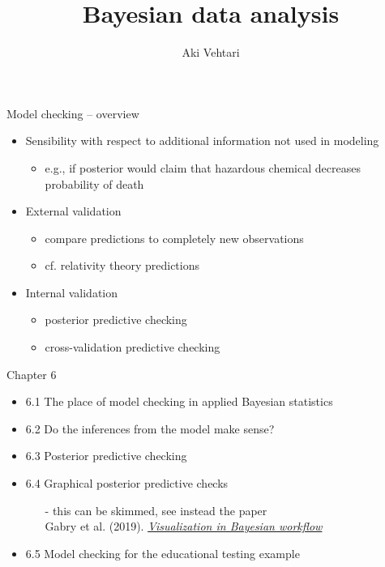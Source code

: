 \documentclass[t]{beamer}
\title[]{Bayesian data analysis}
\subtitle{}
\author{Aki Vehtari}
\institute[Aalto]{}
\begin{document}
 \begin{frame}{Model checking -- overview}

  \begin{itemize}
  \item<+-> Sensibility with respect to additional information not used in modeling
    \begin{itemize}
    \item e.g., if posterior would claim that hazardous chemical
      decreases probability of death
    \end{itemize}
  \item<+-> External validation
    \begin{itemize}
    \item compare predictions to completely new observations
    \item cf. relativity theory predictions
    \end{itemize}
  \item<+-> Internal validation
    \begin{itemize}
    \item posterior predictive checking
    \item cross-validation predictive checking
    \end{itemize}
  \end{itemize}

\end{frame}

\begin{frame}{Chapter 6}

  \begin{itemize}
  \item 6.1 The place of model checking in applied Bayesian statistics
  \item 6.2 Do the inferences from the model make sense?
  \item 6.3 Posterior predictive checking
  \item {\color{gray} 6.4 Graphical posterior predictive checks}    
    \begin{itemize}
    \item[-] this can be skimmed, see instead the paper\\ Gabry et al. (2019). \href{https://doi.org/10.1111/rssa.12378}{\textit{Visualization in Bayesian workflow}}
  \end{itemize}
\item 6.5 Model checking for the educational testing example
  \end{itemize}
  
\end{frame}
\end{document}
